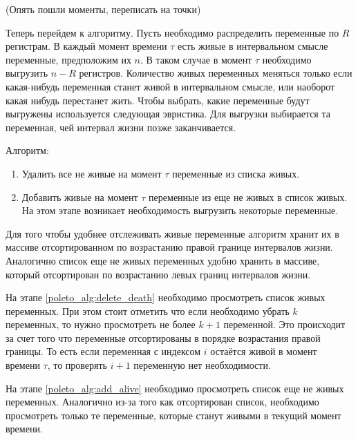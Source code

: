 (Опять пошли моменты, переписать на точки)

Теперь перейдем к алгоритму. Пусть необходимо распределить переменные по $R$ регистрам. В каждый момент
времени $\tau$ есть живые в интервальном смысле переменные, предположим их $n$. В таком случае в момент $\tau$
необходимо выгрузить $n - R$ регистров. Количество живых переменных меняться только если какая-нибудь
переменная станет живой в интервальном смысле, или наоборот какая нибудь перестанет жить.
Чтобы выбрать, какие переменные будут выгружены используется следующая эвристика.
Для выгрузки выбирается та переменная, чей интервал жизни позже заканчивается.

Алгоритм:
\begin{enumerate}
    \item Удалить все не живые на момент $\tau$ переменные из списка живых. \label{poleto_alg:delete_death}
    \item Добавить живые на момент $\tau$ переменные из еще не живых в список живых. На этом этапе
    возникает необходимость выгрузить некоторые переменные. \label{poleto_alg:add_alive}
\end{enumerate}

Для того чтобы удобнее отслеживать живые переменные алгоритм хранит их в массиве отсортированном по
возрастанию правой границе интервалов жизни. Аналогично список еще не живых переменных удобно хранить в массиве,
который отсортирован по возрастанию левых границ интервалов жизни.

На этапе \ref{poleto_alg:delete_death} необходимо просмотреть список живых переменных. При этом стоит отметить
что если необходимо убрать $k$ переменных, то нужно просмотреть не более $k+1$ переменной. Это происходит за счет
того что переменные отсортированы в порядке возрастания правой границы. То есть если переменная с индексом $i$
остаётся живой в момент времени $\tau$, то проверять $i + 1$ переменную нет необходимости.

На этапе \ref{poleto_alg:add_alive} необходимо просмотреть список еще не живых переменных. Аналогично
из-за того как отсортирован список, необходимо просмотреть только те переменные, которые станут живыми
в текущий момент времени.

